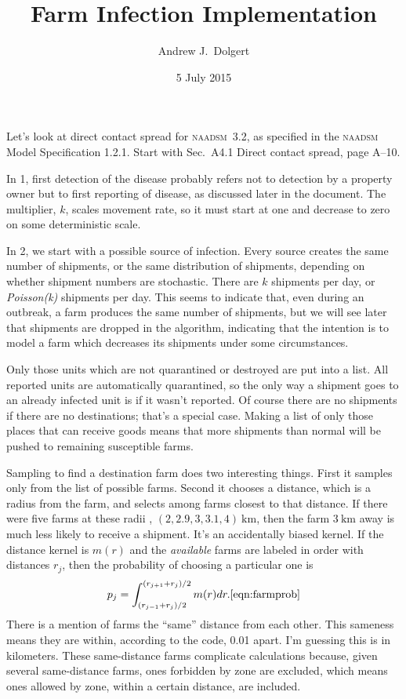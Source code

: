 \documentclass{article}
\title{Farm Infection Implementation}
\author{Andrew J.\ Dolgert}
\date{5 July 2015}
\begin{document}
\maketitle

Let's look at direct contact spread for \textsc{naadsm}~3.2,
as specified in the \textsc{naadsm} Model Specification 1.2.1.
Start with Sec.~A4.1 Direct contact spread, page A--10.

In 1, first detection of the disease probably refers not to
detection by a property owner but to first reporting of
disease, as discussed later in the document. The multiplier, $k$,
scales movement rate, so it must start at one and decrease to zero
on some deterministic scale.

In 2, we start with a possible source of infection. Every source
creates the same number of shipments, or the same distribution
of shipments, depending on whether shipment numbers are stochastic.
There are $k$ shipments per day, or \emph{Poisson(k)} shipments per day.
This seems to indicate that, even during an outbreak, a farm produces
the same number of shipments, but we will see later that shipments
are dropped in the algorithm, indicating that the intention is to
model a farm which decreases its shipments under some circumstances.

Only those units which are not quarantined or destroyed are
put into a list. All reported units are automatically quarantined,
so the only way a shipment goes to an already infected unit is if it wasn't
reported. Of course there are no shipments if there are no destinations;
that's a special case. Making a list of only those places that
can receive goods means that more shipments than normal will be pushed to
remaining susceptible farms.

Sampling to find a destination farm does two interesting things.
First it samples only from the list of possible farms.
Second it chooses a distance, which is a radius from the farm,
and selects among farms closest to that distance. If there were
five farms at these radii , $(2, 2.9, 3, 3.1, 4)\:\mbox{km}$,
then the farm $3\:\mbox{km}$ away is much less likely to receive
a shipment. It's an accidentally biased kernel. If the distance
kernel is $m(r)$ and the \emph{available\/} farms are labeled
in order with distances $r_j$, then the probability of choosing
a particular one is
\begin{equation}
  p_j=\int_{(r_{j-1}+r_j)/2}^{(r_{j+1}+r_j)/2} m(r)dr.\ref{eqn:farmprob}
\end{equation}
There is a mention
of farms the ``same'' distance from each other. This sameness means
they are within, according to the code, 0.01 apart. I'm guessing
this is in kilometers. These same-distance farms complicate
calculations because, given several same-distance farms,
ones forbidden by zone are excluded, which means ones allowed
by zone, within a certain distance, are included.
\end{document}

